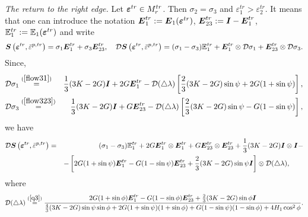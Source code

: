 \documentclass[a4paper,12pt]{article}
\theoremstyle{remark}
\newcommand{\mbf}[1]{\mbox{\boldmath$#1$}}
\numberwithin{equation}{section}
\begin{document}
\bigskip\noindent
{\it The return to the right edge.} Let $\mbf{\varepsilon}^{tr}\in M^{tr}_{r}$.   Then  $\sigma_2=\sigma_3$ and $\varepsilon_1^{tr}>
\varepsilon_2^{tr}$. It means that one can introduce the notation $\mbf E_1^{tr}:=\mbf E_1(\mbf\varepsilon^{tr})$, $\mbf E_{23}^{tr}:=\mbf I-\mbf E_1^{tr}$, $\mathbb E_1^{tr}:=\mathbb E_1(\mbf\varepsilon^{tr})$ and write 
\begin{equation}
\mbf S\left(\mbf{\varepsilon}^{tr},\bar{\varepsilon}^{p,tr}\right)=\sigma_1\mbf E_{1}^{tr}+\sigma_3\mbf E_{23}^{tr},\quad \mathcal D\mbf S\left(\mbf{\varepsilon}^{tr},\bar{\varepsilon}^{p,tr}\right)=(\sigma_1-\sigma_3)\mathbb E_1^{tr}+\mbf E_{1}^{tr}\otimes\mathcal D\sigma_1+\mbf E_{23}^{tr}\otimes\mathcal D\sigma_3.
\label{sigmaE3}
\end{equation}
Since,
\begin{eqnarray*}
\mathcal D\sigma_1&\stackrel{(\ref{flow31})}{=}&\frac{1}{3}(3K-2G)\mbf I+2G\mbf E_{1}^{tr}-\mathcal D(\triangle\lambda)\left[\frac{2}{3}(3K-2G)\sin\psi+2G(1+\sin\psi)\right],\\
\mathcal D\sigma_3&\stackrel{(\ref{flow323})}{=}&\frac{1}{3}(3K-2G)\mbf I+G\mbf E_{23}^{tr}-\mathcal D(\triangle\lambda)\left[\frac{2}{3}(3K-2G)\sin\psi-G(1-\sin\psi)\right],
\end{eqnarray*}
we have
\begin{eqnarray}
\mathcal D\mbf S\left(\mbf{\varepsilon}^{tr},\bar{\varepsilon}^{p,tr}\right)&=&(\sigma_1-\sigma_3)\mathbb E_1^{tr}+2G\mbf E_{1}^{tr}\otimes\mbf E_{1}^{tr}+G\mbf E_{23}^{tr}\otimes\mbf E_{23}^{tr}+\frac{1}{3}(3K-2G)\mbf I\otimes\mbf I-\nonumber\\
&&-\left[2G(1+\sin\psi)\mbf E_{1}^{tr}-G(1-\sin\psi)\mbf E_{23}^{tr}+\frac{2}{3}(3K-2G)\sin\psi\mbf I\right]\otimes\mathcal D(\triangle\lambda),\qquad
\end{eqnarray}
where 
\begin{equation*}
\mathcal D(\triangle\lambda)\stackrel{(\ref{q3})}{=}\frac{2G(1+\sin\phi)\mbf E_{1}^{tr}-G(1-\sin\phi)\mbf E_{23}^{tr}+\frac{2}{3}(3K-2G)\sin\phi\mbf I}{\frac{4}{3}(3K-2G)\sin\psi\sin\phi+2G(1+\sin\psi)(1+\sin\phi)+G(1-\sin\psi)(1-\sin\phi)+4H_1\cos^2\phi}.
\end{equation*}
\end{document}
